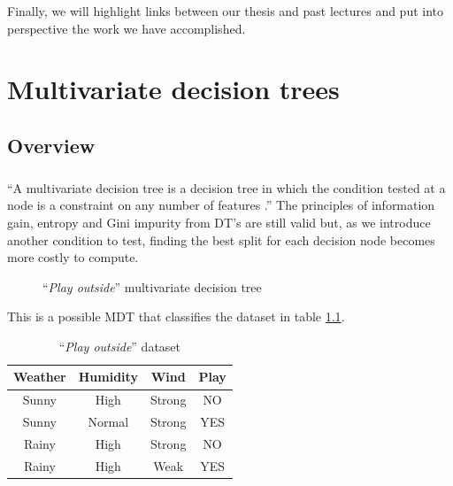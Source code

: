 \documentclass[12pt]{report}
\theoremstyle{definition}
\theoremstyle{definition}
\theoremstyle{definition}
\begin{document}
Finally,  we will highlight links between our thesis and past lectures and put into perspective the work we have accomplished.



\chapter{Multivariate decision trees}
\section{Overview}
\paragraph{} ``A multivariate decision tree is a decision tree in which the condition tested at a node is a constraint on any number of features \cite{multivariate-explaining}.'' The principles of information gain, entropy and Gini impurity from DT's are still valid but, as we introduce another condition to test, finding the best split for each decision node becomes more costly to compute.

\begin{figure}[ht]
    \centering
    \caption{``\textit{Play outside}'' multivariate decision tree}
    \label{fig:multitree}
\end{figure}

This is a possible MDT that classifies the dataset in table \ref{fig:dataweather}.

\begin{table}[ht]
    \centering
    \begin{tabular}{||c c c c||} 
    \hline
    Weather & Humidity & Wind & Play\\[0.5ex]
    \hline\hline
    Sunny & High & Strong & NO\\ 
    Sunny & Normal & Strong & YES\\
    Rainy & High & Strong & NO\\
    Rainy & High & Weak & YES\\ 
    \hline
    \end{tabular}
    \caption{``\textit{Play outside}'' dataset}
    \label{fig:dataweather}
\end{table}
\end{document}
